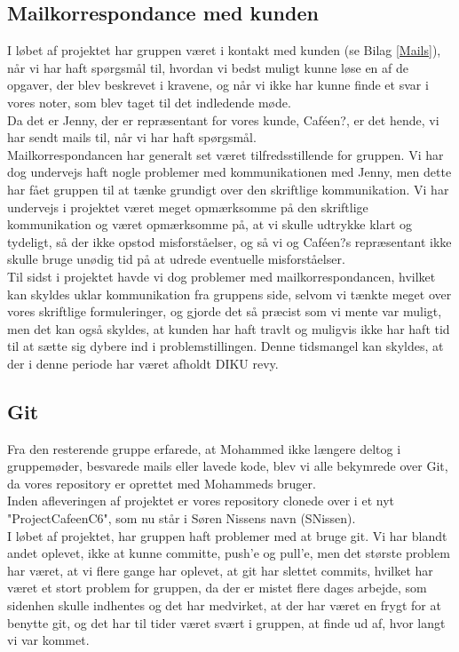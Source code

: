 \documentclass[]{article}
\begin{document}
\subsection{Mailkorrespondance med kunden}

I løbet af projektet har gruppen været i kontakt med kunden (se Bilag \ref{Mails}), når vi har haft spørgsmål til, hvordan vi bedst muligt kunne løse en af de opgaver, der blev beskrevet i kravene, og når vi ikke har kunne finde et svar i vores noter, som blev taget til det indledende møde. \\
Da det er Jenny, der er repræsentant for vores kunde, Caféen?, er det hende, vi har sendt mails til, når vi har haft spørgsmål.\\
Mailkorrespondancen har generalt set været tilfredsstillende for gruppen. Vi har dog undervejs haft nogle problemer med kommunikationen med Jenny, men dette har fået gruppen til at tænke grundigt over den skriftlige kommunikation. Vi har undervejs i projektet været meget opmærksomme på den skriftlige kommunikation og været opmærksomme på, at vi skulle udtrykke klart og tydeligt, så der ikke opstod misforståelser, og så vi og Caféen?s repræsentant ikke skulle bruge unødig tid på at udrede eventuelle misforståelser. \\
Til sidst i projektet havde vi dog problemer med mailkorrespondancen, hvilket kan skyldes uklar kommunikation fra gruppens side, selvom vi tænkte meget over vores skriftlige formuleringer, og gjorde det så præcist som vi mente var muligt, men det kan også skyldes, at kunden har haft travlt og muligvis ikke har haft tid til at sætte sig dybere ind i problemstillingen. Denne tidsmangel kan skyldes, at der i denne periode har været afholdt DIKU revy.
\subsection{Git}
Fra den resterende gruppe erfarede, at Mohammed ikke længere deltog i gruppemøder, besvarede mails eller lavede kode, blev vi alle bekymrede over Git, da vores repository er oprettet med Mohammeds bruger. \\
\indent Inden afleveringen af projektet er vores repository clonede over i et nyt "ProjectCafeenC6", som nu står i Søren Nissens navn (SNissen).\\
\indent I løbet af projektet, har gruppen haft problemer med at bruge git. Vi har blandt andet oplevet, ikke at kunne committe, push'e og pull'e, men det største problem har været, at vi flere gange har oplevet, at git har slettet commits, hvilket har været et stort problem for gruppen, da der er mistet flere dages arbejde, som sidenhen skulle indhentes og det har medvirket, at der har været en frygt for at benytte git, og det har til tider været svært i gruppen, at finde ud af, hvor langt vi var kommet.
\end{document}
